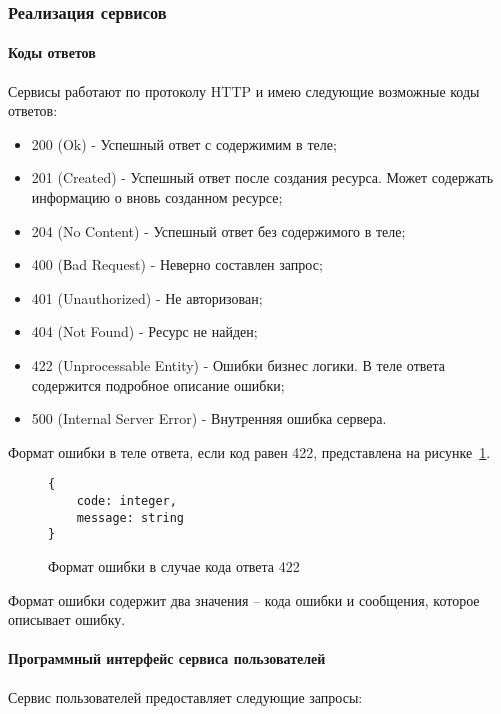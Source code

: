 \subsubsection{Реализация сервисов}

\paragraph{Коды ответов}

Сервисы работают по протоколу HTTP и имею следующие возможные
коды ответов:
\begin{itemize}
	\item 200 (Ok) - Успешный ответ с содержимим в теле;
	\item 201 (Created) - Успешный ответ после создания ресурса. Может
	      содержать информацию о вновь созданном ресурсе;
	\item 204 (No Content) - Успешный ответ без содержимого в теле;
	\item 400 (Вad Request) - Неверно составлен запрос;
	\item 401 (Unauthorized) - Не авторизован;
	\item 404 (Not Found) - Ресурс не найден;
	\item 422 (Unprocessable Entity) - Ошибки бизнес логики. В теле ответа
	      содержится подробное описание ошибки;
	\item 500 (Internal Server Error) - Внутренняя ошибка сервера.
\end{itemize}

Формат ошибки в теле ответа, если код равен 422, представлена на
рисунке~\ref{f:error-struct}.


\begin{figure}[ht]
	\centering
	\vspace{\toppaddingoffigure}
	\begin{lstlisting}
{
    code: integer,
    message: string
}
    \end{lstlisting}
	\caption{Формат ошибки в случае кода ответа 422}
	\label{f:error-struct}
\end{figure}

Формат ошибки содержит два значения – кода ошибки и сообщения,
которое описывает ошибку.

\paragraph{Программный интерфейс сервиса пользователей}

Сервис пользователей предоставляет следующие запросы:

